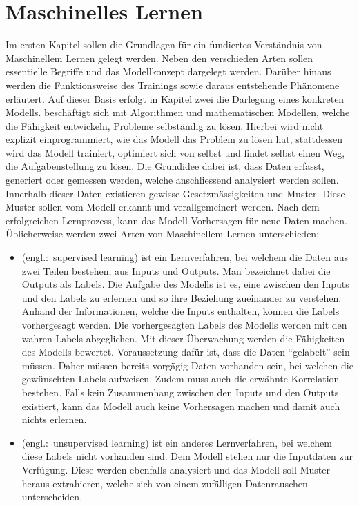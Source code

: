 \chapter{Maschinelles Lernen}

Im ersten Kapitel sollen die Grundlagen für ein fundiertes Verständnis
von Maschinellem Lernen gelegt werden. Neben den verschieden Arten sollen
essentielle Begriffe und das Modellkonzept dargelegt werden. Darüber hinaus werden
die Funktionsweise des Trainings sowie daraus entstehende Phänomene erläutert.
Auf dieser Basis erfolgt in Kapitel zwei die Darlegung eines konkreten Modells.
\para{}
 beschäftigt sich mit Algorithmen und
mathematischen Modellen, welche die Fähigkeit entwickeln, Probleme selbständig
zu lösen.
Hierbei wird nicht explizit einprogrammiert, wie das Modell das Problem zu lösen
hat, stattdessen wird das Modell trainiert, optimiert sich von selbst und findet selbst
einen Weg, die Aufgabenstellung zu lösen.
Die Grundidee dabei ist, dass Daten erfasst, generiert oder gemessen werden,
welche anschliessend analysiert werden sollen.
Innerhalb dieser Daten existieren gewisse
Gesetzmässigkeiten und Muster. Diese Muster sollen vom Modell
erkannt und verallgemeinert werden. Nach dem erfolgreichen Lernprozess,
kann das Modell Vorhersagen für neue Daten machen.
\para{}
Üblicherweise werden zwei Arten von Maschinellem Lernen unterschieden:
\begin{itemize}
\item{
     (engl.:\ supervised learning) ist ein
    Lernverfahren, bei welchem die Daten aus zwei Teilen bestehen, aus Inputs und
    Outputs. Man bezeichnet dabei die Outputs als Labels. Die Aufgabe des Modells
    ist es, eine  zwischen den Inputs und den Labels zu
    erlernen und so ihre Beziehung zueinander zu verstehen.
    Anhand der Informationen, welche die Inputs enthalten,
    können die Labels vorhergesagt werden. Die vorhergesagten Labels des Modells
    werden mit den wahren Labels abgeglichen. Mit dieser Überwachung werden die
    Fähigkeiten des Modells bewertet.
    \para{}
    Voraussetzung dafür ist, dass die Daten ``gelabelt'' sein müssen.
    Daher müssen bereits vorgägig Daten vorhanden sein, bei welchen die gewünschten
    Labels aufweisen. Zudem muss auch die erwähnte Korrelation bestehen. Falls
    kein Zusammenhang zwischen den Inputs und den Outputs existiert, kann das
    Modell auch keine Vorhersagen machen und damit auch nichts erlernen.
  }
\item{
     (engl.:\ unsupervised learning) ist ein anderes
    Lernverfahren, bei welchem diese Labels nicht vorhanden sind. Dem
    Modell stehen nur die Inputdaten zur Verfügung. Diese werden ebenfalls analysiert
    und das Modell soll Muster heraus extrahieren, welche sich von einem
    zufälligen Datenrauschen unterscheiden.
  }
\end{itemize}


